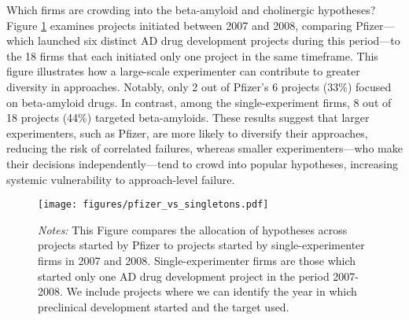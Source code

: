 \begin{table}[h!]
    \centering
    \scriptsize
    \caption{\textsc{Drug development projects started for Alzheimer's disease by hypothesis 1998-2008}}
    \vspace{1em}
    
    \label{tab:alzheimers-projects-by-target}
    \vspace{1em}
    \caption*{\scriptsize\emph{Notes:} This table shows the distribution of drug development projects in Alzheimer's Disease between 1998 and 2008 by hypothesis. We include projects where we can identify the year in which preclinical development started and the target used. Our data describe the target that a drug is intended to act upon, not the broader underlying theory or hypothesis. For illustration purposes, in this table, we group targets into broader hypothesis groups. The beta-amyloid hypothesis includes drugs that target amyloid-beta, beta-secretase, adrenoceptor beta 1 and 2, and glutamate metabotropic. The cholinergic hypothesis includes drug projects that target cholinergic receptors and acetylcholine. Other hypotheses for AD include the tau hypothesis, mitochondrial cascade hypothesis, calcium homeostasis hypothesis, neurovascular hypothesis, inflammatory hypothesis, metal ion hypothesis, and lymphatic system hypothesis \citep{liu2019history}.}
\end{table}

\noindent Which firms are crowding into the beta-amyloid and cholinergic hypotheses? Figure \ref{fig:pfizer_vs_singletons} examines projects initiated between 2007 and 2008, comparing Pfizer---which launched six distinct AD drug development projects during this period—to the 18 firms that each initiated only one project in the same timeframe. This figure illustrates how a large-scale experimenter can contribute to greater diversity in approaches. Notably, only 2 out of Pfizer's 6 projects (33\%) focused on beta-amyloid drugs. In contrast, among the single-experiment firms, 8 out of 18 projects (44\%) targeted beta-amyloids. These results suggest that larger experimenters, such as Pfizer, are more likely to diversify their approaches, reducing the risk of correlated failures, whereas smaller experimenters---who make their decisions independently---tend to crowd into popular hypotheses, increasing systemic vulnerability to approach-level failure.


\begin{figure}[h]
    \centering
    \caption{\textsc{AD projects started by hypothesis for Pfizer and single-shot firms 2007-2008}}
    \texttt{[image: figures/pfizer\_vs\_singletons.pdf]}
    \label{fig:pfizer_vs_singletons}
    \caption*{\scriptsize\emph{Notes:} This Figure compares the allocation of hypotheses across projects started by Pfizer to projects started by single-experimenter firms in 2007 and 2008. Single-experimenter firms are those which started only one AD drug development project in the period 2007-2008. We include projects where we can identify the year in which preclinical development started and the target used.}
\end{figure}